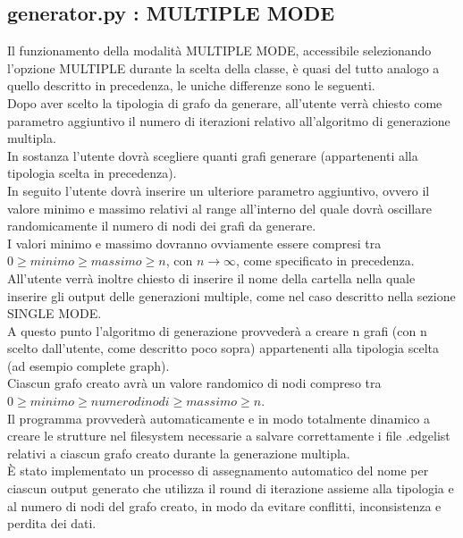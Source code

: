 \subsection{generator.py : MULTIPLE MODE}
\justify
Il funzionamento della modalità MULTIPLE MODE, accessibile selezionando l'opzione MULTIPLE durante la scelta della classe, è quasi del tutto analogo a quello descritto in precedenza, le uniche differenze sono le seguenti.\\

Dopo aver scelto la tipologia di grafo da generare, all'utente verrà chiesto come parametro aggiuntivo il numero di iterazioni relativo all'algoritmo di generazione multipla.\\
In sostanza l'utente dovrà scegliere quanti grafi generare (appartenenti alla tipologia scelta in precedenza).\\

In seguito l'utente dovrà inserire un ulteriore parametro aggiuntivo, ovvero il valore minimo e massimo relativi al range all'interno del quale dovrà oscillare randomicamente il numero di nodi dei grafi da generare.\\
I valori minimo e massimo dovranno ovviamente essere compresi tra \(0 \geq minimo \geq massimo \geq n\), con \(n\to\infty\), come specificato in precedenza.\\

All'utente verrà inoltre chiesto di inserire il nome della cartella nella quale inserire gli output delle generazioni multiple, come nel caso descritto nella sezione SINGLE MODE.\\

A questo punto l'algoritmo di generazione provvederà a creare n grafi (con n scelto dall'utente, come descritto poco sopra) appartenenti alla tipologia scelta (ad esempio complete graph).\\
Ciascun grafo creato avrà un valore randomico di nodi compreso tra \(0 \geq minimo \geq numero di nodi \geq massimo \geq n\).\\

Il programma provvederà automaticamente e in modo totalmente dinamico a creare le strutture nel filesystem necessarie a salvare correttamente i file .edgelist relativi a ciascun grafo creato durante la generazione multipla.\\
È stato implementato un processo di assegnamento automatico del nome per ciascun output generato che utilizza il round di iterazione assieme alla tipologia e al numero di nodi del grafo creato, in modo da evitare conflitti, inconsistenza e perdita dei dati.\\

